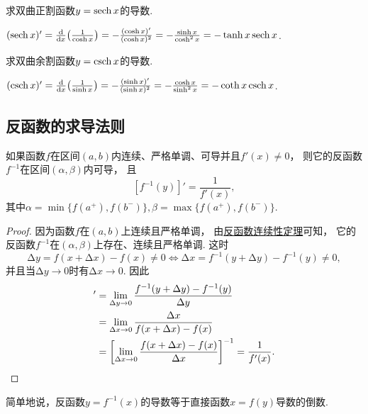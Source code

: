 \begin{example}%
求双曲正割函数\(y = \sech x\)的导数.
\begin{solution}
\((\sech x)'
= \dv{x}(\frac1{\cosh x})
= -\frac{(\cosh x)'}{(\cosh x)^2}
= -\frac{\sinh x}{\cosh^2 x}
= -\tanh x \sech x\).
\end{solution}
\end{example}

\begin{example}%
求双曲余割函数\(y = \csch x\)的导数.
\begin{solution}
\((\csch x)'
= \dv{x}(\frac1{\sinh x})
= -\frac{(\sinh x)'}{(\sinh x)^2}
= -\frac{\cosh x}{\sinh^2 x}
= -\coth x \csch x\).
\end{solution}
\end{example}

\subsection{反函数的求导法则}
\begin{theorem}
如果函数\(f\)在区间\((a,b)\)内连续、严格单调、可导并且\(f'(x)\neq0\)，
则它的反函数\(f^{-1}\)在区间\((\alpha,\beta)\)内可导，
且\[
	[f^{-1}(y)]'=\frac1{f'(x)},
\]
其中\(\alpha=\min\{f(a^+),f(b^-)\},
\beta=\max\{f(a^+),f(b^-)\}\).
\begin{proof}
因为函数\(f\)在\((a,b)\)上连续且严格单调，
由\hyperref[theorem:极限.连续函数的极限2]{反函数连续性定理}可知，
它的反函数\(f^{-1}\)在\((\alpha,\beta)\)上存在、连续且严格单调.
这时\[
	\increment y = f(x + \increment x) - f(x) \neq 0
	\iff
	\increment x = f^{-1}(y + \increment y) - f^{-1}(y) \neq 0,
\]
并且当\(\increment y \to 0\)时有\(\increment x \to 0\).
因此\begin{align*}
	[f^{-1}(y)]'
	&= \lim_{\increment y \to 0}
		\frac{f^{-1}(y + \increment y) - f^{-1}(y)}{\increment y} \\
	&= \lim_{\increment x \to 0}
		\frac{\increment x}{f(x + \increment x) - f(x)} \\
	&= \left[
		\lim_{\increment x \to 0}
		\frac{f(x + \increment x) - f(x)}{\increment x}
	\right]^{-1}
	= \frac1{f'(x)}.
	\qedhere
\end{align*}
\end{proof}
\end{theorem}

简单地说，反函数\(y=f^{-1}(x)\)的导数等于直接函数\(x=f(y)\)导数的倒数.

